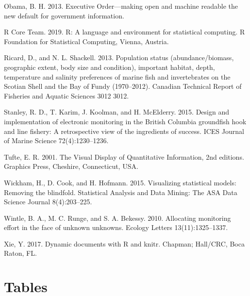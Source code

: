 \documentclass[12pt,]{article}
\begin{document}
\leavevmode\hypertarget{ref-obama2013}{}%
Obama, B. H. 2013. Executive Order---making open and machine readable the new default for government information.

\leavevmode\hypertarget{ref-r2019}{}%
R Core Team. 2019. R: A language and environment for statistical computing. R Foundation for Statistical Computing, Vienna, Austria.

\leavevmode\hypertarget{ref-ricard2013}{}%
Ricard, D., and N. L. Shackell. 2013. Population status (abundance/biomass, geographic extent, body size and condition), important habitat, depth, temperature and salinity preferences of marine fish and invertebrates on the Scotian Shell and the Bay of Fundy (1970--2012). Canadian Technical Report of Fisheries and Aquatic Sciences 3012 3012.

\leavevmode\hypertarget{ref-stanley2015}{}%
Stanley, R. D., T. Karim, J. Koolman, and H. McElderry. 2015. Design and implementation of electronic monitoring in the British Columbia groundfish hook and line fishery: A retrospective view of the ingredients of success. ICES Journal of Marine Science 72(4):1230--1236.

\leavevmode\hypertarget{ref-tufte2001}{}%
Tufte, E. R. 2001. The Visual Display of Quantitative Information, 2nd editions. Graphics Press, Cheshire, Connecticut, USA.

\leavevmode\hypertarget{ref-wickham2015}{}%
Wickham, H., D. Cook, and H. Hofmann. 2015. Visualizing statistical models: Removing the blindfold. Statistical Analysis and Data Mining: The ASA Data Science Journal 8(4):203--225.

\leavevmode\hypertarget{ref-wintle2010}{}%
Wintle, B. A., M. C. Runge, and S. A. Bekessy. 2010. Allocating monitoring effort in the face of unknown unknowns. Ecology Letters 13(11):1325--1337.

\leavevmode\hypertarget{ref-xie2017}{}%
Xie, Y. 2017. Dynamic documents with R and knitr. Chapman; Hall/CRC, Boca Raton, FL.

\hypertarget{tables}{%
\section*{Tables}\label{tables}}

\clearpage
\end{document}
